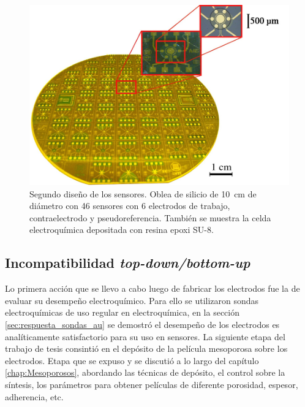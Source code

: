 {					  %
					  \begin{figure}[h!]
					  \begin{center}
					  \includegraphics[width=\textwidth]{Imagenes/ObleaV2.jpg}
					  \caption[Electrodos, segunda versión]{Segundo diseño de los sensores. Oblea de silicio de \SI{10}{cm} de diámetro con 46 sensores con 6 electrodos de trabajo, contraelectrodo y pseudoreferencia. También se muestra la celda electroquímica depositada con resina epoxi SU-8.}
					  \label{fig:ObleaV2}
					  \end{center}
					  \end{figure} 	
	
    \subsection{Incompatibilidad \textit{top-down/bottom-up}}

  			Lo primera acción que se llevo a cabo luego de fabricar los electrodos fue la de evaluar su desempeño electroquímico. Para ello se utilizaron sondas electroquímicas de uso regular en electroquímica, en la sección \ref{sec:respuesta_sondas_au} se demostró el desempeño de los electrodos es analíticamente satisfactorio para su uso en sensores. La siguiente etapa del trabajo de tesis consintió en el depósito de la película mesoporosa sobre los electrodos. Etapa que se expuso y se discutió a lo largo del capítulo \ref{chap:Mesoporosos}, abordando las técnicas de depósito, el control sobre la síntesis, los parámetros para obtener películas de diferente porosidad, espesor, adherencia, etc.

}
